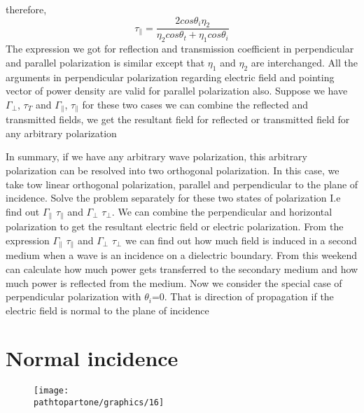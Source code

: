therefore,
\begin{equation}
\tau_{\parallel} = \frac{2 cos\theta_{i} \eta_{2}}{\eta_{2} cos\theta_{t} + \eta_{1} cos\theta_{i}} 
\end{equation}
The expression we got for reflection and transmission coefficient in perpendicular and parallel polarization is similar except that $\eta_{1}$ and $\eta_{2}$ are interchanged. All the arguments in perpendicular polarization regarding electric field and pointing vector of power density are valid for parallel polarization also. Suppose we have $\Gamma_{\perp}$, $\tau_{T}$ and $\Gamma_{\parallel}$, $\tau_{\parallel}$ for these two cases we can combine the reflected and transmitted fields, we get the resultant field for reflected or transmitted field for any arbitrary  polarization 

In summary, if we have any arbitrary wave polarization, this arbitrary polarization can be resolved into two orthogonal polarization. In this case, we take tow linear orthogonal polarization, parallel and perpendicular to the plane of incidence. Solve the problem separately for these two states of polarization I.e find out $\Gamma_{\parallel}$  $\tau_{\parallel}$ and $\Gamma_{\bot}$ $\tau_{\perp}$. We can combine the perpendicular and horizontal polarization to get the resultant electric field or electric polarization. From the expression $\Gamma_{\parallel}$  $\tau_{\parallel}$ and $\Gamma_{\bot}$ $\tau_{\bot}$ we can find out how much field is induced in a second medium when a wave is an incidence on a dielectric boundary. From this weekend can calculate how much power gets transferred to the secondary medium and how much power is reflected from the medium. 
Now we consider the special case of perpendicular polarization with  $\theta_{i}$=0. That is direction of propagation if the electric  field is normal to the plane of incidence

\section{Normal incidence} 
\begin{figure}[h]
\centering
\texttt{[image: \\pathtopartone/graphics/16]}
\caption{}
\label{fig:16}
\end{figure}

